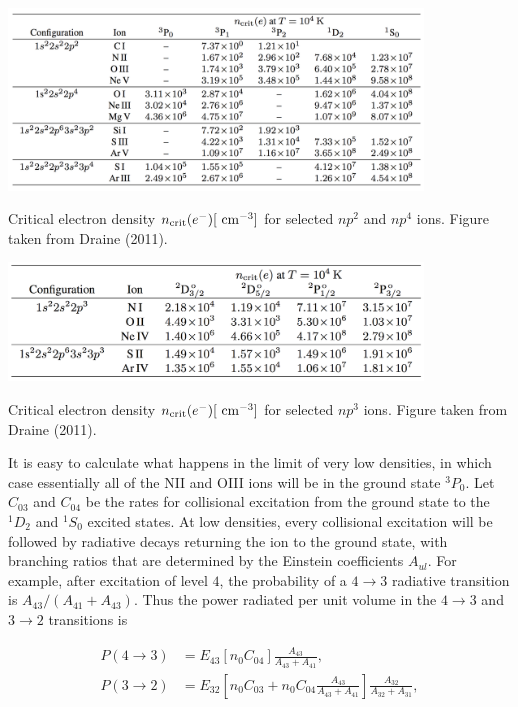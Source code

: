 \documentclass[a4paper,10pt]{article}
\begin{document}
\begin{table}[t!]
    \centering
    \includegraphics[width=11cm]{figures/ncrit_np2np4.png}
    \caption{\footnotesize{Critical electron density $n_{\rm crit}(e^-)[~{\rm cm^{-3}}]$ for selected $np^2$ and $np^4$ ions. Figure taken from Draine (2011).}}
    \label{table:ncrit24}
\end{table}

\begin{table}[t!]
    \centering
    \includegraphics[width=11cm]{figures/ncrit_np3.png}
    \caption{\footnotesize{Critical electron density $n_{\rm crit}(e^-)[~{\rm cm^{-3}}]$ for selected $np^3$ ions. Figure taken from Draine (2011).}}
    \label{table:ncrit3}
\end{table}

{\noindent}It is easy to calculate what happens in the limit of very low densities, in which case essentially all of the NII and OIII ions will be in the ground state $^3P_0$. Let $C_{03}$ and $C_{04}$ be the rates for collisional excitation from the ground state to the $^1D_2$ and $^1S_0$ excited states. At low densities, every collisional excitation will be followed by radiative decays returning the ion to the ground state, with branching ratios that are determined by the Einstein coefficients $A_{ul}$. For example, after excitation of level $4$, the probability of a $4\rightarrow3$ radiative transition is $A_{43}/(A_{41}+A_{43})$. Thus the power radiated per unit volume in the $4\rightarrow3$ and $3\rightarrow2$ transitions is

\begin{align*}
    P(4\rightarrow3) &= E_{43}[n_0C_{04}] \frac{A_{43}}{A_{43}+A_{41}}, \\
    P(3\rightarrow2) &= E_{32}\left[n_0C_{03} + n_0C_{04}\frac{A_{43}}{A_{43}+A_{41}}\right] \frac{A_{32}}{A_{32}+A_{31}},
\end{align*}
\end{document}
